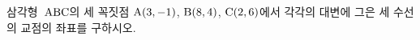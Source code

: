 삼각형~$\mathrm{ABC}$의 세 꼭짓점 $\mathrm{A}(3{,}\mkern3mu\mathopen{}-1)$, $\mathrm{B}(8{,}\mkern3mu\mathopen{}4)$, $\mathrm{C}(2{,}\mkern3mu\mathopen{}6)$에서 각각의 대변에 그은 세 수선의 교점의 좌표를 구하시오.
